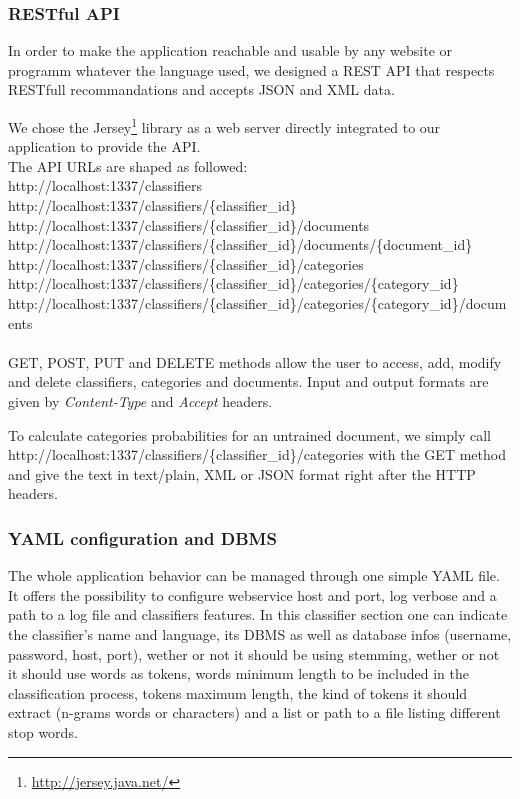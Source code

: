 \documentclass[a4paper,11pt]{article}
\begin{document}
\subsubsection{RESTful API}

In order to make the application reachable and usable by any website or
programm whatever the language used, we designed a REST API that respects
RESTfull recommandations and accepts JSON and XML data.

We chose the Jersey\footnote{\url{http://jersey.java.net/}} library as a
web server directly integrated to our application to provide the API.
~\\

The API URLs are shaped as followed:\\
http://localhost:1337/classifiers \\
http://localhost:1337/classifiers/\{classifier\_id\} \\
http://localhost:1337/classifiers/\{classifier\_id\}/documents \\
http://localhost:1337/classifiers/\{classifier\_id\}/documents/\{document\_id\} \\
http://localhost:1337/classifiers/\{classifier\_id\}/categories \\
http://localhost:1337/classifiers/\{classifier\_id\}/categories/\{category\_id\} \\
http://localhost:1337/classifiers/\{classifier\_id\}/categories/\{category\_id\}/documents \\
~\\

GET, POST, PUT and DELETE methods allow the user to access, add, modify and
delete classifiers, categories and documents. Input and output formats are
given by \textit{Content-Type} and
\textit{Accept} headers.

To calculate categories probabilities for an untrained document, we simply
call \\ http://localhost:1337/classifiers/\{classifier\_id\}/categories with the
GET method and give the text in text/plain, XML or JSON format right after the
HTTP headers.

\subsubsection{YAML configuration and DBMS}

The whole application behavior can be managed through one simple YAML file.
It offers the possibility to configure webservice host and port, log verbose
and a path to a log file and classifiers features. In this classifier section
one can indicate the classifier's name and language, its DBMS as well as
database infos (username, password, host, port), wether or not it should be
using stemming, wether or not it should use words as tokens,  words minimum
length to be included in the classification process, tokens maximum length,
the kind of tokens it should extract (n-grams words or characters) and a list
or path to a file listing different stop words.
\end{document}
